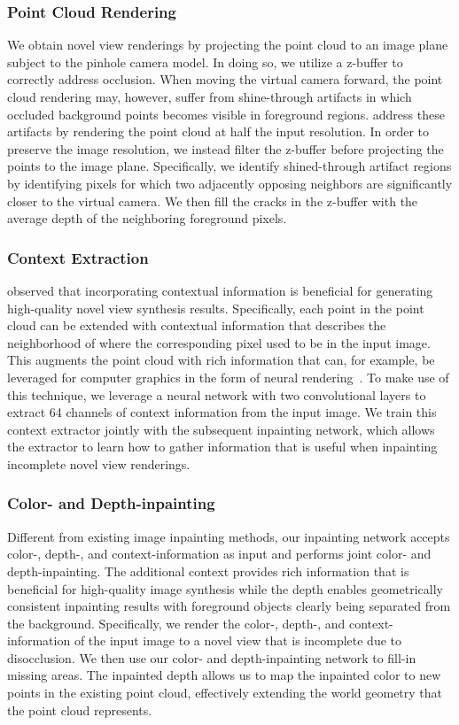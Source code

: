 \documentclass[acmtog,authorversion]{acmart}
\begin{document}
\subsubsection{Point Cloud Rendering} We obtain novel view renderings by projecting the point cloud to an image plane subject to the pinhole camera model. In doing so, we utilize a z-buffer to correctly address occlusion. When moving the virtual camera forward, the point cloud rendering may, however, suffer from shine-through artifacts in which occluded background points becomes visible in foreground regions. \cite{Tulsiani_ECCV_2018} address these artifacts by rendering the point cloud at half the input resolution. In order to preserve the image resolution, we instead filter the z-buffer before projecting the points to the image plane. Specifically, we identify shined-through artifact regions by identifying pixels for which two adjacently opposing neighbors are significantly closer to the virtual camera. We then fill the cracks in the z-buffer with the average depth of the neighboring foreground pixels.

\subsubsection{Context Extraction}

\cite{Niklaus_CVPR_2018} observed that incorporating contextual information is beneficial for generating high-quality novel view synthesis results. Specifically, each point in the point cloud can be extended with contextual information that describes the neighborhood of where the corresponding pixel used to be in the input image. This augments the point cloud with rich information that can, for example, be leveraged for computer graphics in the form of neural rendering~\cite{Aliev_ARXIV_2019, Bui_OTHER_2018, Meshry_CVPR_2019}. To make use of this technique, we leverage a neural network with two convolutional layers to extract 64 channels of context information from the input image. We train this context extractor jointly with the subsequent inpainting network, which allows the extractor to learn how to gather information that is useful when inpainting incomplete novel view renderings.

\subsubsection{Color- and Depth-inpainting}

Different from existing image inpainting methods, our inpainting network accepts color-, depth-, and context-information as input and performs joint color- and depth-inpainting. The additional context provides rich information that is beneficial for high-quality image synthesis while the depth enables geometrically consistent inpainting results with foreground objects clearly being separated from the background. Specifically, we render the color-, depth-, and context-information of the input image to a novel view that is incomplete due to disocclusion. We then use our color- and depth-inpainting network to fill-in missing areas. The inpainted depth allows us to map the inpainted color to new points in the existing point cloud, effectively extending the world geometry that the point cloud represents.
\end{document}
